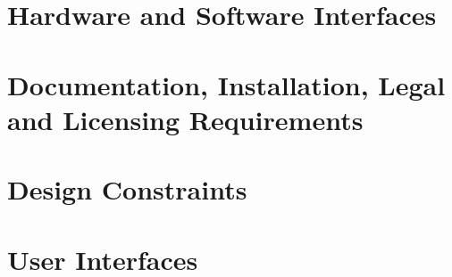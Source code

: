 \documentclass[12pt]{article}
\begin{document}
\section{Hardware and Software Interfaces}



\section{Documentation, Installation, Legal and Licensing Requirements}



\section{Design Constraints}



\section{User Interfaces}

\appendix
\end{document}
